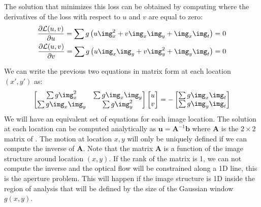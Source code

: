 The solution that minimizes this loss can be obtained by computing where the derivatives of the loss with respect to $u$ and $v$ are equal to zero:
\begin{eqnarray}
    \frac{\partial \mathcal{L}(u, v)}{\partial u } =
    \sum g \left( u \img_x ^ 2 + v \img_x \img_y + \img_x \img_t  \right) = 0 \\
    \frac{\partial \mathcal{L}(u, v)}{\partial v } =
    \sum g \left( u \img_x \img_y + v \img_y^2 + \img_y \img_t  \right) = 0
\end{eqnarray}

We can write the previous two equations in matrix form at each location $(x',y')$ as:
\begin{equation}
    \begin{bmatrix}
        \sum g \img_x ^ 2    & \sum g \img_x \img_y \\
        \sum g \img_x \img_y & \sum g \img_y ^ 2
    \end{bmatrix}
    \begin{bmatrix}
        u \\
        v
    \end{bmatrix}
    =
    -
    \begin{bmatrix}
        \sum g \img_x \img_t \\
        \sum g \img_y \img_t
    \end{bmatrix}
    \label{eq:lk}
\end{equation}
We will have an equivalent set of equations for each image location. The solution at each location can be computed analytically as $\mathbf{u} = \mathbf{A}^{-1} \textbf{b}$ where $\mathbf{A}$ is the $2 \times 2$ matrix of \eqn{\ref{eq:lk}}. The motion at location $x,y$ will only be uniquely defined if we can compute the inverse of $\mathbf{A}$. Note that the matrix $\mathbf{A}$ is a function of the image structure around location $(x,y)$. If the rank of the matrix is 1, we can not compute the inverse and the optical flow will be constrained along a 1D line, this is the aperture problem. This will happen if the image structure is 1D inside the region of analysis that will be defined by the size of the Gaussian window $g(x,y)$.


